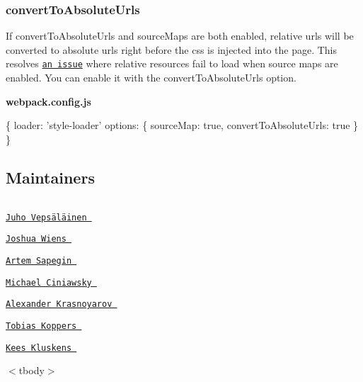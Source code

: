 \subsubsection*{{\ttfamily convert\+To\+Absolute\+Urls}}

If convert\+To\+Absolute\+Urls and source\+Maps are both enabled, relative urls will be converted to absolute urls right before the css is injected into the page. This resolves \href{https://github.com/webpack/style-loader/pull/96}{\tt an issue} where relative resources fail to load when source maps are enabled. You can enable it with the convert\+To\+Absolute\+Urls option.

{\bfseries webpack.\+config.\+js} 
\begin{DoxyCode}
\{
  loader: 'style-loader'
  options: \{
    sourceMap: true,
    convertToAbsoluteUrls: true
  \}
\}
\end{DoxyCode}


\subsection*{Maintainers}

\tabulinesep=1mm
\begin{longtabu} spread 0pt [c]{*{0}{|X[-1]}|}
\hline
\end{longtabu}


\href{https://github.com/bebraw}{\tt Juho Vepsäläinen }  

\href{https://github.com/d3viant0ne}{\tt Joshua Wiens }  

\href{https://github.com/sapegin}{\tt Artem Sapegin }  

\href{https://github.com/michael-ciniawsky}{\tt Michael Ciniawsky }  

\href{https://github.com/evilebottnawi}{\tt Alexander Krasnoyarov }   

\href{https://github.com/sokra}{\tt Tobias Koppers }  

\href{https://github.com/SpaceK33z}{\tt Kees Kluskens }  

$<$tbody$>$ 